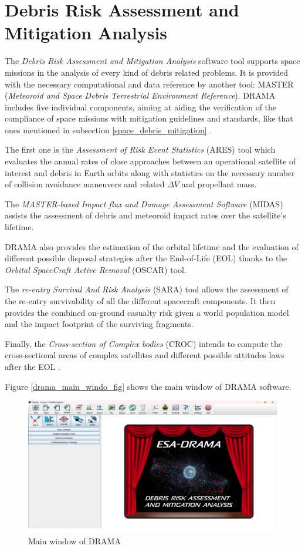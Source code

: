 \section{Debris Risk Assessment and Mitigation Analysis} \label{drama_section}
The \textit{Debris Risk Assessment and Mitigation Analysis} software tool supports space missions in the analysis of every kind of debris related problems.
It is provided with the necessary computational and data reference by another tool: MASTER (\textit{Meteoroid and Space Debris Terrestrial Environment Reference}).
DRAMA includes five individual components, aiming at  aiding the verification of the compliance of space missions with mitigation guidelines and standards, like that ones mentioned in subsection \ref{space_debris_mitigation} \cite{braun2013drama}.

The first one is the \textit{Assessment of Risk Event Statistics} (ARES) tool which evaluates the annual rates of close approaches between an operational satellite of interest and debris in Earth orbits along with statistics on the necessary number of collision avoidance maneuvers and related $\Delta V$ and propellant mass.

The \textit{MASTER-based Impact flux and Damage Assessment Software} (MIDAS) assists the assessment of debris and meteoroid impact rates over the satellite's lifetime.

DRAMA also provides the estimation of the orbital lifetime and the evaluation of different possible disposal strategies after the End-of-Life (EOL) thanks to the \textit{Orbital SpaceCraft Active Removal} (OSCAR) tool.

The \textit{re-entry Survival And Risk Analysis} (SARA) tool allows the assessment of the re-entry survivability of all the different spacecraft components. 
It then provides the combined on-ground casualty risk given a world population model and the impact footprint of the surviving fragments.  

Finally, the \textit{Cross-section of Complex bodies} (CROC) intends to compute the cross-sectional areas of complex satellites and different possible attitudes laws after the EOL \cite{braun2020drama}.

Figure \ref{drama_main_windo_fig} shows the main window of DRAMA software.
\begin{figure}[h]
    \centering
    \includegraphics[scale=0.25]{img/drama_mainwindow.png}
    \caption{Main window of DRAMA}
    \label{drama_main_window_fig}
\end{figure}